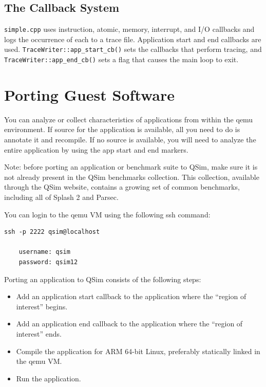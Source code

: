 \documentclass[letterpaper, 10pt]{book}
\begin{document}
\section{The Callback System}

\texttt{simple.cpp} uses instruction, atomic, memory, interrupt, and I/O
callbacks and logs the occurrence of each to a trace file. Application start
and end callbacks are used. \texttt{TraceWriter::app\_start\_cb()} sets the
callbacks that perform tracing, and \texttt{TraceWriter::app\_end\_cb()}
sets a flag that causes the main loop to exit.

\chapter{Porting Guest Software} \label{chap:porting}

You can analyze or collect characteristics of applications from within the
qemu environment. If source for the application is available, all you need to
do is annotate it and recompile. If no source is available, you will need to
analyze the entire application by using the app start and end markers.

Note: before porting an application or benchmark suite to QSim, make sure it is 
not already present in the QSim benchmarks collection. This collection,
available through the QSim website, contains a growing set of common benchmarks,
including all of Splash 2 and Parsec.

You can login to the qemu VM using the following ssh command:

\begin{lstlisting}[frame=none]
    ssh -p 2222 qsim@localhost

    username: qsim
    password: qsim12
\end{lstlisting}

Porting an application to QSim consists of the following steps:

\begin{itemize}
  \item{Add an application start callback to the application where the ``region
        of interest'' begins.}
  \item{Add an application end callback to the application where the ``region of
        interest'' ends.}
  \item{
    Compile the application for ARM 64-bit Linux, preferably statically linked
    in the qemu VM.}
  \item{
    Run the application.
    }
\end{itemize}
\end{document}
